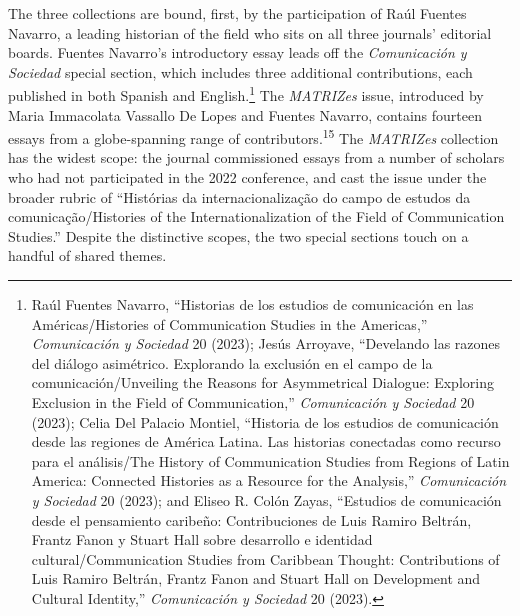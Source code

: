 \documentclass{tufte-handout}
\begin{document}
The three collections are bound, first, by the participation of Raúl
Fuentes Navarro, a leading historian of the field who sits on all three
journals' editorial boards. Fuentes Navarro's introductory essay leads
off the \emph{Comunicación y Sociedad} special section, which includes
three additional contributions, each published in both Spanish and
English.\footnote{Raúl Fuentes Navarro, ``Historias de los estudios de
  comunicación en las Américas/Histories of Communication Studies in the
  Americas,'' \emph{Comunicación y Sociedad} 20 (2023); Jesús Arroyave,
  ``Develando las razones del diálogo asimétrico. Explorando la
  exclusión en el campo de la comunicación/Unveiling the Reasons for
  Asymmetrical Dialogue: Exploring Exclusion in the Field of
  Communication,'' \emph{Comunicación y Sociedad} 20 (2023); Celia Del
  Palacio Montiel, ``Historia de los estudios de comunicación desde las
  regiones de América Latina. Las historias conectadas como recurso para
  el análisis/The History of Communication Studies from Regions of Latin
  America: Connected Histories as a Resource for the Analysis,''
  \emph{Comunicación y Sociedad} 20 (2023); and Eliseo R. Colón Zayas,
  ``Estudios de comunicación desde el pensamiento caribeño:
  Contribuciones de Luis Ramiro Beltrán, Frantz Fanon y Stuart Hall
  sobre desarrollo e identidad cultural/Communication Studies from
  Caribbean Thought: Contributions of Luis Ramiro Beltrán, Frantz Fanon
  and Stuart Hall on Development and Cultural Identity,''
  \emph{Comunicación y Sociedad} 20 (2023).} The \emph{MATRIZes} issue,
introduced by Maria Immacolata Vassallo De Lopes and Fuentes Navarro,
contains fourteen essays from a globe-spanning range of
contributors.\textsuperscript{15} The \emph{MATRIZes} collection
has the widest scope: the journal commissioned essays from a number of
scholars who had not participated in the 2022 conference, and cast the
issue under the broader rubric of ``Histórias da internacionalização do
campo de estudos da comunicação/Histories of the Internationalization of
the Field of Communication Studies.'' Despite the distinctive scopes,
the two special sections touch on a handful of shared themes.
\end{document}
